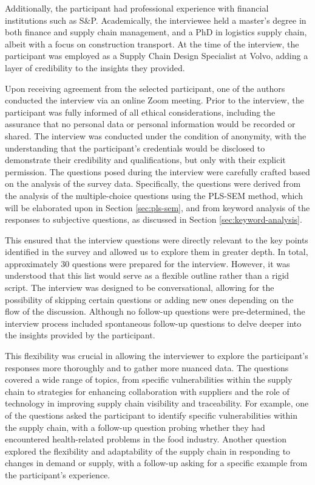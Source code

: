 Additionally, the participant had professional experience with financial institutions such as S\&P. Academically, the interviewee held a master's degree in both finance and supply chain management, and a PhD in logistics supply chain, albeit with a focus on construction transport. At the time of the interview, the participant was employed as a Supply Chain Design Specialist at Volvo, adding a layer of credibility to the insights they provided.


Upon receiving agreement from the selected participant, one of the authors conducted the interview via an online Zoom meeting. Prior to the interview, the participant was fully informed of all ethical considerations, including the assurance that no personal data or personal information would be recorded or shared. The interview was conducted under the condition of anonymity, with the understanding that the participant's credentials would be disclosed to demonstrate their credibility and qualifications, but only with their explicit permission. The questions posed during the interview were carefully crafted based on the analysis of the survey data. Specifically, the questions were derived from the analysis of the multiple-choice questions using the PLS-SEM method, which will be elaborated upon in Section \ref{sec:pls-sem}, and from keyword analysis of the responses to subjective questions, as discussed in Section \ref{sec:keyword-analysis}. 

This ensured that the interview questions were directly relevant to the key points identified in the survey and allowed us to explore them in greater depth. In total, approximately 30 questions were prepared for the interview. However, it was understood that this list would serve as a flexible outline rather than a rigid script. The interview was designed to be conversational, allowing for the possibility of skipping certain questions or adding new ones depending on the flow of the discussion. Although no follow-up questions were pre-determined, the interview process included spontaneous follow-up questions to delve deeper into the insights provided by the participant. 

This flexibility was crucial in allowing the interviewer to explore the participant's responses more thoroughly and to gather more nuanced data. The questions covered a wide range of topics, from specific vulnerabilities within the supply chain to strategies for enhancing collaboration with suppliers and the role of technology in improving supply chain visibility and traceability. For example, one of the questions asked the participant to identify specific vulnerabilities within the supply chain, with a follow-up question probing whether they had encountered health-related problems in the food industry. Another question explored the flexibility and adaptability of the supply chain in responding to changes in demand or supply, with a follow-up asking for a specific example from the participant's experience.

